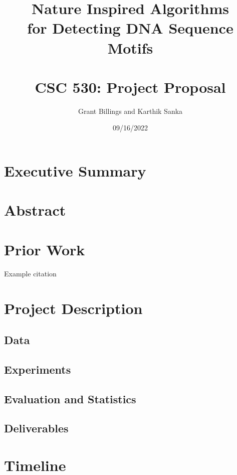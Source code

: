 \documentclass{article}
\title{%
	Nature Inspired Algorithms \\
	for Detecting DNA Sequence Motifs \\
	\large \; \\ CSC 530: Project Proposal}
\author{Grant Billings and Karthik Sanka}
\date{09/16/2022}
\begin{document}
\maketitle
\section{Executive Summary}
\section{Abstract}
\section{Prior Work}
Example citation \cite{fister2013brief}
\section{Project Description}
\subsection{Data}
\subsection{Experiments}
\subsection{Evaluation and Statistics}
\subsection{Deliverables}
\section{Timeline}
\printbibliography
\end{document}
